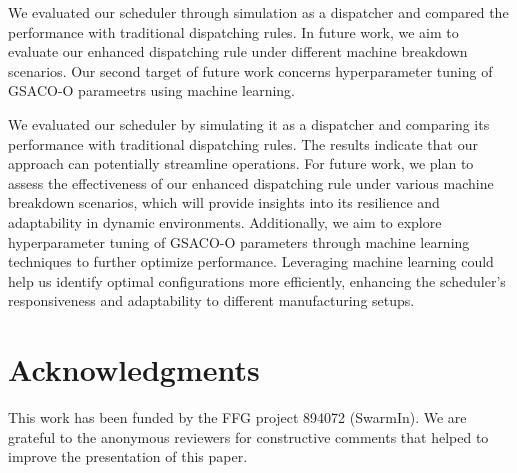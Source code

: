 \documentclass[runningheads]{llncs}
\begin{document}
We evaluated our scheduler through simulation as a dispatcher and compared the performance with traditional dispatching rules. In future work, we aim to evaluate our enhanced dispatching rule under different machine breakdown scenarios. 
Our second target of future work concerns hyperparameter tuning of GSACO-O parameetrs using machine learning.

We evaluated our scheduler by simulating it as a dispatcher and comparing its performance with traditional dispatching rules. The results indicate that our approach can potentially streamline operations. For future work, we plan to assess the effectiveness of our enhanced dispatching rule under various machine breakdown scenarios, which will provide insights into its resilience and adaptability in dynamic environments.
Additionally, we aim to explore hyperparameter tuning of GSACO-O parameters through machine learning techniques to further optimize performance. Leveraging machine learning could help us identify optimal configurations more efficiently, enhancing the scheduler's responsiveness and adaptability to different manufacturing setups.

\section*{Acknowledgments}
This work has been funded by the FFG project 894072 (SwarmIn).
We are grateful to the anonymous reviewers for constructive 
comments that helped to improve the presentation of this paper.




%
%
%
% 
% 
%

\end{document}

